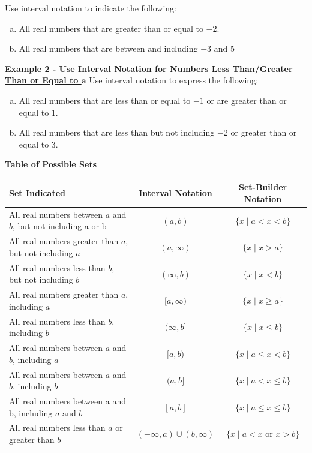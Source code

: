 \documentclass[12pt]{book}
\begin{document}
Use interval notation to indicate the following:
\begin{enumerate}[(a)]
    \item All real numbers that are greater than or equal to $-2$.
    \vspace{25mm}
    \item All real numbers that are between and including $-3$ and $5$
    \vspace{25mm}
\end{enumerate}

\underline{\textbf{Example 2 - Use Interval Notation for Numbers Less Than/Greater Than or Equal to $\textbf{a}$}}
\vspace{1mm}
Use interval notation to express the following:
\begin{enumerate}[(a)]
    \item All real numbers that are less than or equal to $-1$ or are greater than or equal to $1$.
    \vspace{25mm}
    \item All real numbers that are less than but not including $-2$ or greater than or equal to $3$.
      \vspace{25mm}  
\end{enumerate}



\centerline{\textbf{Table of Possible Sets}}
\vspace{3mm}

{\hspace{-14mm}
\begin{tabular}{ |l|c|c| } 
 \hline
 \textbf{Set Indicated} & \textbf{Interval Notation} & \textbf{Set-Builder Notation} \\ 
 \hline
 All real numbers between $a$ and $b$, but not including a or b & $(a,b)$ & $\{x \mid a < x < b\}$ \\ 
 \hline
 All real numbers greater than $a$, but not including $a$ & $(a,\infty)$ & $\{x \mid x > a\}$ \\ 
 \hline
 All real numbers less than $b$, but not including $b$ & $(\infty, b)$ & $\{x \mid x< b \}$ \\
 \hline
 All real numbers greater than $a$, including $a$ & $[a, \infty)$ & $\{x \mid x \geq a \}$ \\
 \hline
 All real numbers less than $b$, including $b$ & $(\infty, b ]$ & $\{x \mid x \leq b\}$ \\
 \hline
 All real numbers between $a$ and $b$, including $a$ & $[a,b)$ & $\{x \mid a \leq x < b\}$ \\
 \hline
 All real numbers between $a$ and $b$, including $b$ & $(a,b]$ & $\{x \mid a < x \leq b\}$ \\
 \hline
 All real numbers between a and b, including $a$ and $b$ & $[a,b]$ & $\{x \mid a \leq x \leq b \}$ \\
 \hline
 All real numbers less than $a$ or greater than $b$ & $(-\infty, a) \cup (b, \infty)$ & $\{ x \mid a < x \text{ or } x >b\}$ \\
 \hline
\end{tabular}
}
\end{document}
